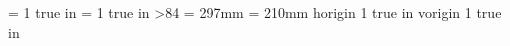 %

\ifx\luatexversion\thisisundefined
  \ifx\pdfoutput\undefined
  \else
    \ifx\pdfoutput\relax
    \else
      \pdfpageheight 210mm\relax
      \pdfpagewidth 297mm\relax
      \pdfhorigin = 1 true in
      \pdfvorigin = 1 true in
    \fi
  \fi
\else
  \ifnum\luatexversion>84
    \pagewidth = 297mm
    \pageheight = 210mm
    \pdfvariable horigin 1 true in
    \pdfvariable vorigin 1 true in
  \fi
\fi

\newcount\columnsperpage








%
%
%

